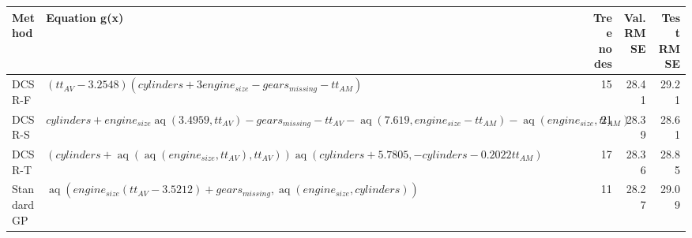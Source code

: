 \begin{tabular}{lp{8cm}rrr}
\toprule
Method & Equation g(x) & Tree nodes & Val. RMSE & Test RMSE \\
\midrule
DCSR-F & $\left(tt_{AV} - 3.2548\right) \left(cylinders + 3 engine_{size} - gears_{missing} - tt_{AM}\right)$ & 15 & 28.41 & 29.21 \\
DCSR-S & $cylinders + engine_{size} \operatorname{aq}{\left(3.4959,tt_{AV} \right)} - gears_{missing} - tt_{AV} - \operatorname{aq}{\left(7.619,engine_{size} - tt_{AM} \right)} - \operatorname{aq}{\left(engine_{size},tt_{AM} \right)}$ & 21 & 28.39 & 28.61 \\
DCSR-T & $\left(cylinders + \operatorname{aq}{\left(\operatorname{aq}{\left(engine_{size},tt_{AV} \right)},tt_{AV} \right)}\right) \operatorname{aq}{\left(cylinders + 5.7805,- cylinders - 0.2022 tt_{AM} \right)}$ & 17 & 28.36 & 28.85 \\
Standard GP & $\operatorname{aq}{\left(engine_{size} \left(tt_{AV} - 3.5212\right) + gears_{missing},\operatorname{aq}{\left(engine_{size},cylinders \right)} \right)}$ & 11 & 28.27 & 29.09 \\
\bottomrule
\end{tabular}
